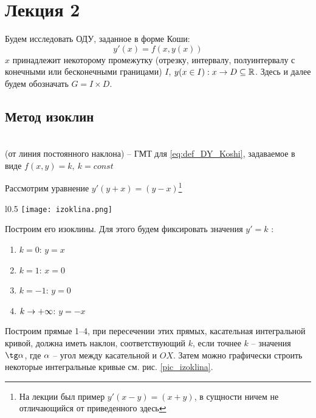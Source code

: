 \section{\Large{Лекция 2}}
Будем исследовать ОДУ, заданное в форме Коши:
\begin{equation} \label{eq:def_DY_Koshi}
y'(x) = f(x, y(x))
\end{equation}
$x$ принадлежит некоторому промежутку (отрезку, интервалу, полуинтервалу с конечными или бесконечными границами) $I$, $y(x \in I): x \to D \subseteq \mathbb{R}$. Здесь и далее будем обозначать $G = I \times D$.
\subsection{\large{Метод изоклин}}
\begin{Def} \\
 (от линия постоянного наклона) -- ГМТ для \eqref{eq:def_DY_Koshi}, задаваемое в виде $f(x,y) = k, ~ k = const$
\end{Def}
Рассмотрим уравнение $y'(y+x) = (y-x)$\footnote{На лекции был пример $y'(x-y)=(x+y)$, в сущности ничем не отличающийся от приведенного здесь} 

\begin{wrapfigure}{l}{0.5\linewidth}
\texttt{[image: izoklina.png]}
\caption{}  \label{pic_izoklina}
\end{wrapfigure}
Построим его изоклины. Для этого будем фиксировать значения $y' = k$ :
\begin{enumerate}
\item $k = 0$: $y = x$
\item $k = 1$: $x = 0$
\item $k = -1$: $y = 0$
\item $k \rightarrow +\infty$: $y = -x$
\end{enumerate}
Построим прямые 1--4, при пересечении этих прямых, касательная интегральной кривой, должна иметь наклон, соответствующий $k$, если точнее $k$ -- значения $\tg \al$, где $\alpha$ -- угол между касательной и $OX$. Затем можно графически строить некоторые интегральные кривые см. рис. \ref{pic_izoklina}.
\clearpage
